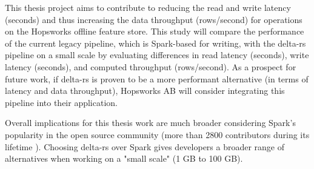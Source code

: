 This thesis project aims to contribute to reducing the read and write latency (seconds) and thus increasing the data throughput (rows/second) for operations on the Hopsworks offline feature store. This study will compare the performance of the current legacy pipeline, which is Spark-based for writing, with the delta-rs pipeline on a small scale by evaluating differences in read latency (seconds), write latency (seconds), and computed throughput (rows/second). As a prospect for future work, if delta-rs is proven to be a more performant alternative (in terms of latency and data throughput), Hopsworks \gls{AB} will consider integrating this pipeline into their application.

Overall implications for this thesis work are much broader considering Spark's popularity in the open source community (more than 2800 contributors during its lifetime \cite{ApacheSparkOpen}). Choosing delta-rs over Spark gives developers a broader range of alternatives when working on a "small scale" (1 GB to 100 GB).